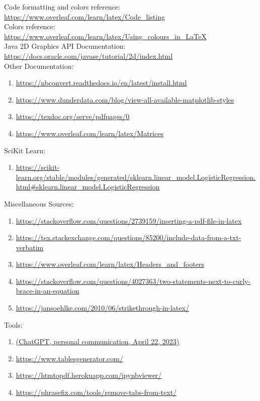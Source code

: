 \documentclass[notitlepage,a4paper,oneside,article,table]{article}
\begin{document}
Code formatting and colors reference: \url{https://www.overleaf.com/learn/latex/Code_listing}\\
Colors reference: \url{https://www.overleaf.com/learn/latex/Using_colours_in_LaTeX}\\
Java 2D Graphics API Documentation: \url{https://docs.oracle.com/javase/tutorial/2d/index.html}\\

Other Documentation:
\begin{enumerate}
    \item \url{https://nbconvert.readthedocs.io/en/latest/install.html}
    \item \url{https://www.dunderdata.com/blog/view-all-available-matplotlib-styles}
    \item \url{https://texdoc.org/serve/pdfpages/0}
    \item \url{https://www.overleaf.com/learn/latex/Matrices}
\end{enumerate}

SciKit Learn:
\begin{enumerate}
    \item \url{https://scikit-learn.org/stable/modules/generated/sklearn.linear_model.LogisticRegression.html#sklearn.linear_model.LogisticRegression}
\end{enumerate}


\vspace{0.5cm}

Miscellaneous Sources:
\begin{enumerate}
    \item \url{https://stackoverflow.com/questions/2739159/inserting-a-pdf-file-in-latex}
    \item \url{https://tex.stackexchange.com/questions/85200/include-data-from-a-txt-verbatim}
    \item \url{https://www.overleaf.com/learn/latex/Headers_and_footers}
    \item \url{https://stackoverflow.com/questions/4027363/two-statements-next-to-curly-brace-in-an-equation}
    \item \url{https://jansoehlke.com/2010/06/strikethrough-in-latex/}
\end{enumerate}

Tools:
\begin{enumerate}
    \item \url{(ChatGPT, personal communication, April 22, 2023)}
    \item \url{https://www.tablesgenerator.com/}
    \item \url{https://htmtopdf.herokuapp.com/ipynbviewer/}
    \item \url{https://phrasefix.com/tools/remove-tabs-from-text/}
\end{enumerate}
\end{document}
